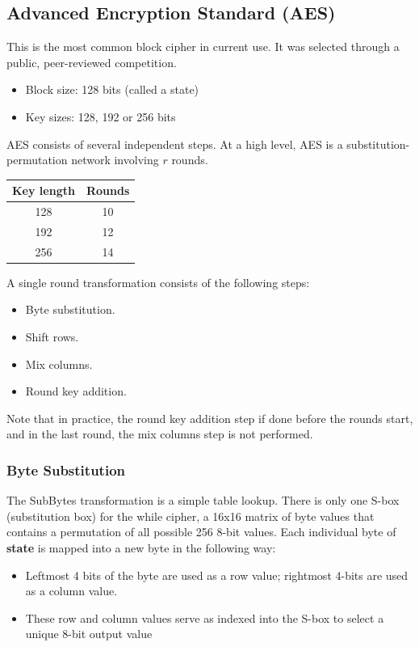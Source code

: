 \documentclass{article}
\begin{document}
\subsection{Advanced Encryption Standard (AES)}
This is the most common block cipher in current use. It was selected through a public, peer-reviewed competition.
\begin{itemize}
	\item Block size: 128 bits (called a state)
	\item Key sizes: 128, 192 or 256 bits
\end{itemize}
AES consists of several independent steps. At a high level, AES is a substitution-permutation network involving $r$ rounds.
\begin{center}
	\begin{tabular}{|c|c|}
		\hline
		Key length & Rounds \\ \hline
		128 & 10 \\
		192 & 12 \\
		256 & 14 \\
		\hline
	\end{tabular}
\end{center}
A single round transformation consists of the following steps:
\begin{itemize}
	\item Byte substitution.
	\item Shift rows.
	\item Mix columns.
	\item Round key addition.
\end{itemize}
Note that in practice, the round key addition step if done before the rounds start, and in the last round, the mix columns step is not performed.

\subsubsection{Byte Substitution}
The SubBytes transformation is a simple table lookup. There is only one S-box (substitution box) for the while cipher, a 16x16 matrix of byte values that contains a permutation of all possible 256 8-bit values. Each individual byte of \textbf{state} is mapped into a new byte in the following way:
\begin{itemize}
	\item Leftmost 4 bits of the byte are used as a row value; rightmost 4-bits are used as a column value.
	\item These row and column values serve as indexed into the S-box to select a unique 8-bit output value
\end{itemize}
\end{document}
